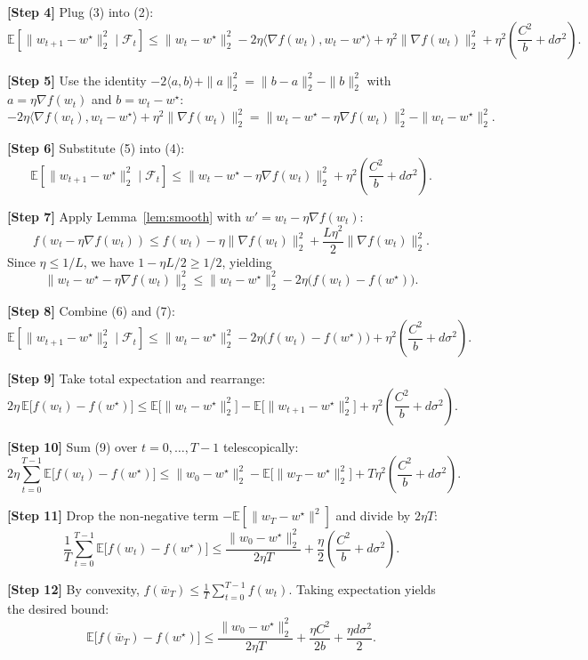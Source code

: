 \documentclass{article}
\newcommand{\E}{\mathbb{E}}
\begin{document}
\noindent\textbf{[Step 4]}  Plug (3) into (2):
\[
\E\!\left[\|w_{t+1}-w^\star\|_2^2\mid\mathcal{F}_t\right]
\le \|w_t-w^\star\|_2^2-2\eta\langle \nabla f(w_t),w_t-w^\star\rangle
+\eta^2\|\nabla f(w_t)\|_2^2+\eta^2\!\left(\frac{C^2}{b}+d\sigma^2\right).
\tag{4}
\]

\noindent\textbf{[Step 5]}  Use the identity $-2\langle a,b\rangle+\|a\|_2^2 = \|b-a\|_2^2-\|b\|_2^2$ with $a=\eta\nabla f(w_t)$ and $b=w_t-w^\star$:
\[
-2\eta\langle \nabla f(w_t),w_t-w^\star\rangle+\eta^2\|\nabla f(w_t)\|_2^2
= \|w_t-w^\star-\eta\nabla f(w_t)\|_2^2-\|w_t-w^\star\|_2^2 .
\tag{5}
\]

\noindent\textbf{[Step 6]}  Substitute (5) into (4):
\[
\E\!\left[\|w_{t+1}-w^\star\|_2^2\mid\mathcal{F}_t\right]
\le \|w_t-w^\star-\eta\nabla f(w_t)\|_2^2
+\eta^2\!\left(\frac{C^2}{b}+d\sigma^2\right).
\tag{6}
\]

\noindent\textbf{[Step 7]}  Apply Lemma~\ref{lem:smooth} with $w'=w_t-\eta\nabla f(w_t)$:
\[
f(w_t-\eta\nabla f(w_t))\le f(w_t)-\eta\|\nabla f(w_t)\|_2^2+\frac{L\eta^2}{2}\|\nabla f(w_t)\|_2^2.
\]
Since $\eta\le 1/L$, we have $1-\eta L/2\ge 1/2$, yielding
\[
\|w_t-w^\star-\eta\nabla f(w_t)\|_2^2
\le \|w_t-w^\star\|_2^2-2\eta\bigl(f(w_t)-f(w^\star)\bigr).
\tag{7}
\]

\noindent\textbf{[Step 8]}  Combine (6) and (7):
\[
\E\!\left[\|w_{t+1}-w^\star\|_2^2\mid\mathcal{F}_t\right]
\le \|w_t-w^\star\|_2^2-2\eta\bigl(f(w_t)-f(w^\star)\bigr)
+\eta^2\!\left(\frac{C^2}{b}+d\sigma^2\right).
\tag{8}
\]

\noindent\textbf{[Step 9]}  Take total expectation and rearrange:
\[
2\eta\,\E\!\big[f(w_t)-f(w^\star)\big]
\le \E\!\big[\|w_t-w^\star\|_2^2\big]-\E\!\big[\|w_{t+1}-w^\star\|_2^2\big]
+\eta^2\!\left(\frac{C^2}{b}+d\sigma^2\right).
\tag{9}
\]

\noindent\textbf{[Step 10]}  Sum (9) over $t=0,\dots,T-1$ telescopically:
\[
2\eta\sum_{t=0}^{T-1}\E\!\big[f(w_t)-f(w^\star)\big]
\le \|w_0-w^\star\|_2^2-\E\!\big[\|w_T-w^\star\|_2^2\big]
+T\eta^2\!\left(\frac{C^2}{b}+d\sigma^2\right).
\tag{10}
\]

\noindent\textbf{[Step 11]}  Drop the non‑negative term $-\E[\|w_T-w^\star\|^2]$ and divide by $2\eta T$:
\[
\frac{1}{T}\sum_{t=0}^{T-1}\E\!\big[f(w_t)-f(w^\star)\big]
\le \frac{\|w_0-w^\star\|_2^2}{2\eta T}
+\frac{\eta}{2}\!\left(\frac{C^2}{b}+d\sigma^2\right).
\tag{11}
\]

\noindent\textbf{[Step 12]}  By convexity, $f(\bar w_T)\le\frac{1}{T}\sum_{t=0}^{T-1}f(w_t)$. Taking expectation yields the desired bound:
\[
\E\!\big[f(\bar w_T)-f(w^\star)\big]
\le\frac{\|w_0-w^\star\|_2^2}{2\eta T}
+\frac{\eta C^2}{2b}
+\frac{\eta d\sigma^2}{2}.
\tag{12}
\]
\end{document}
